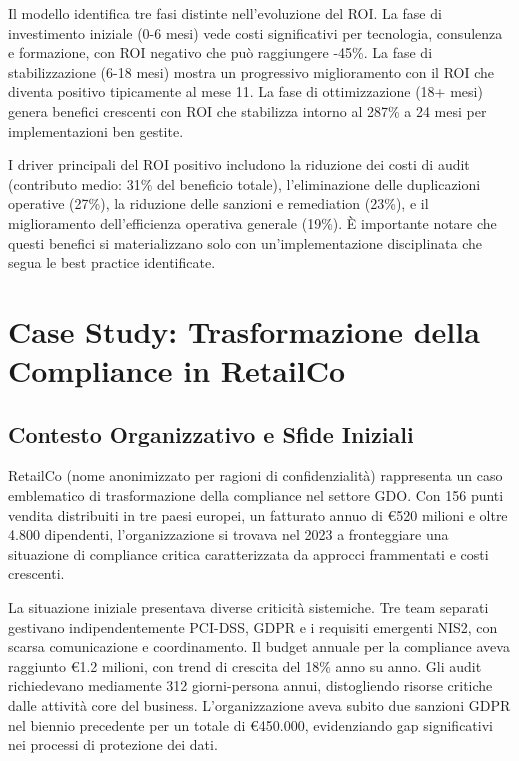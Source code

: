 
Il modello identifica tre fasi distinte nell'evoluzione del ROI. La fase di investimento iniziale (0-6 mesi) vede costi significativi per tecnologia, consulenza e formazione, con ROI negativo che può raggiungere -45\%. La fase di stabilizzazione (6-18 mesi) mostra un progressivo miglioramento con il ROI che diventa positivo tipicamente al mese 11. La fase di ottimizzazione (18+ mesi) genera benefici crescenti con ROI che stabilizza intorno al 287\% a 24 mesi per implementazioni ben gestite.

I driver principali del ROI positivo includono la riduzione dei costi di audit (contributo medio: 31\% del beneficio totale), l'eliminazione delle duplicazioni operative (27\%), la riduzione delle sanzioni e remediation (23\%), e il miglioramento dell'efficienza operativa generale (19\%). È importante notare che questi benefici si materializzano solo con un'implementazione disciplinata che segua le best practice identificate.

\section{Case Study: Trasformazione della Compliance in RetailCo}

\subsection{Contesto Organizzativo e Sfide Iniziali}

RetailCo (nome anonimizzato per ragioni di confidenzialità) rappresenta un caso emblematico di trasformazione della compliance nel settore GDO. Con 156 punti vendita distribuiti in tre paesi europei, un fatturato annuo di €520 milioni e oltre 4.800 dipendenti, l'organizzazione si trovava nel 2023 a fronteggiare una situazione di compliance critica caratterizzata da approcci frammentati e costi crescenti.

La situazione iniziale presentava diverse criticità sistemiche. Tre team separati gestivano indipendentemente PCI-DSS, GDPR e i requisiti emergenti NIS2, con scarsa comunicazione e coordinamento. Il budget annuale per la compliance aveva raggiunto €1.2 milioni, con trend di crescita del 18\% anno su anno. Gli audit richiedevano mediamente 312 giorni-persona annui, distogliendo risorse critiche dalle attività core del business. L'organizzazione aveva subito due sanzioni GDPR nel biennio precedente per un totale di €450.000, evidenziando gap significativi nei processi di protezione dei dati.

